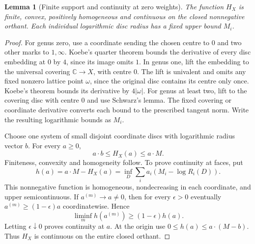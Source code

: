 \documentclass[11pt,a4paper]{article}
\newtheorem{lemma}[theorem]{Lemma}
\theoremstyle{definition}
\newcommand{\C}{\mathbb C}
\begin{document}
\begin{lemma}[Finite support and continuity at zero weights]\label{lem:radius-support}
The function $H_X$ is finite, convex, positively homogeneous and continuous on the closed nonnegative orthant. Each individual logarithmic disc radius has a fixed upper bound $M_i$.
\end{lemma}
\begin{proof}
For genus zero, use a coordinate sending the chosen centre to $0$ and two other marks to $1,\infty$. Koebe's quarter theorem \cite[Appendix, p.~13]{Siu} bounds the derivative of every disc embedding at $0$ by $4$, since its image omits $1$. In genus one, lift the embedding to the universal covering $\C\to X$, with centre $0$. The lift is univalent and omits any fixed nonzero lattice point $\omega$, since the original disc contains its centre only once. Koebe's theorem bounds its derivative by $4|\omega|$. For genus at least two, lift to the covering disc with centre $0$ and use Schwarz's lemma. The fixed covering or coordinate derivative converts each bound to the prescribed tangent norm. Write the resulting logarithmic bounds as $M_i$.

Choose one system of small disjoint coordinate discs with logarithmic radius vector $b$. For every $a\ge0$,
\[
                   a\cdot b\le H_X(a)\le a\cdot M.
\]
Finiteness, convexity and homogeneity follow. To prove continuity at faces, put
\[
 h(a)=a\cdot M-H_X(a)
     =\inf_D\sum_i a_i(M_i-\log R_i(D)).
\]
This nonnegative function is homogeneous, nondecreasing in each coordinate, and upper semicontinuous. If $a^{(m)}\to a\ne0$, then for every $\epsilon>0$ eventually $a^{(m)}\ge(1-\epsilon)a$ coordinatewise. Hence
\[
 \liminf_m h(a^{(m)})\ge(1-\epsilon)h(a).
\]
Letting $\epsilon\downarrow0$ proves continuity at $a$. At the origin use $0\le h(a)\le a\cdot(M-b)$. Thus $H_X$ is continuous on the entire closed orthant.
\end{proof}
\end{document}
